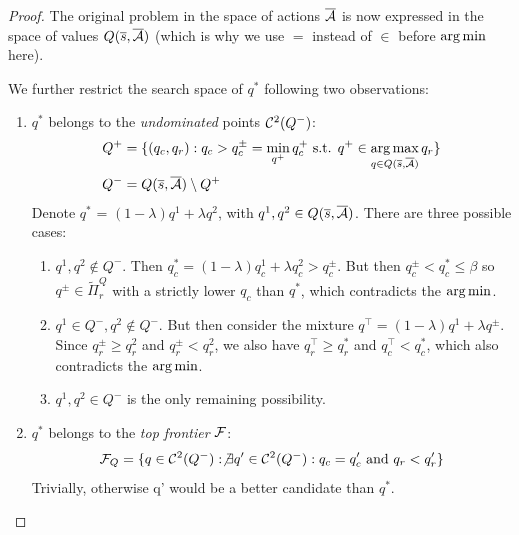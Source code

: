 \begin{proof}
The original problem in the space of actions $\overline{\mathcal{A}}$ is now expressed in the space of values $Q(\overline{s}, \overline{\mathcal{A}})$ (which is why we use $=$ instead of $\in$ before $\operatorname*{arg\,min}$ here).

We further restrict the search space of $q^*$ following two observations:
\begin{enumerate}
    \item $q^*$ belongs to the \emph{undominated} points $\mathcal{C}^2(Q^-)$:
    \begin{align}
        \label{eq:q_minus_undominated}
        Q^+ &= \{(q_c, q_r): q_c > q_c^{\pm} = \min_{q^+} q_c^+\text{ s.t. }q^+\in\operatorname*{arg\,max}_{q\in Q(\overline{s},\overline{\mathcal{A}})} q_r\}\\
        Q^- &= Q(\overline{s},\overline{\mathcal{A}}) \setminus Q^+
    \end{align}
    Denote $q^*$ = $(1-\lambda) q^1 + \lambda q^2$, with $q^1, q^2\in Q(\overline{s},\overline{\mathcal{A}})$. There are three possible cases:
    \begin{enumerate}
        \item $q^1, q^2 \not\in Q^-$. Then $q_c^* = (1-\lambda) q^1_c + \lambda q^2_c > q_c^{\pm}$. But then $q_c^{\pm} < q_c^* \leq \beta$ so $q^{\pm}\in\tilde{\Pi}^Q_r$ with a strictly lower $q_c$ than $q^*$, which contradicts the $\operatorname*{arg\,min}$.
        \item $q^1\in Q^-, q^2 \not\in Q^-$. But then consider the mixture $q^\top = (1-\lambda) q^1 + \lambda q^\pm$. Since $q_r^{\pm} \geq q_r^{2}$ and $q_r^{\pm} < q_r^{2}$, we also have $q^\top_r \geq q_r^*$ and $q^\top_c < q_c^*$, which also contradicts the $\operatorname*{arg\,min}$.
        \item $q^1,q^2\in Q^-$ is the only remaining possibility.
    \end{enumerate}
    \item $q^*$ belongs to the \emph{top frontier} $\mathcal{F}$:
    \begin{equation*}
        \mathcal{F}_Q = \{q\in \mathcal{C}^2(Q^-): \not\exists q'\in \mathcal{C}^2(Q^-): q_c=q_c'\text{ and }q_r<q_r'\}
    \end{equation*}
    Trivially, otherwise q' would be a better candidate than $q^*$.
\end{enumerate}



\end{proof}
